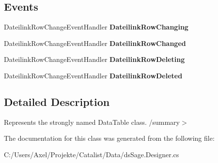 \subsection*{Events}
\begin{DoxyCompactItemize}
\item 
Dateilink\+Row\+Change\+Event\+Handler {\bfseries Dateilink\+Row\+Changing}\hypertarget{class_products_1_1_data_1_1ds_sage_1_1_dateilink_data_table_ac79d3679df2c8093f038d02d1263987d}{}\label{class_products_1_1_data_1_1ds_sage_1_1_dateilink_data_table_ac79d3679df2c8093f038d02d1263987d}

\item 
Dateilink\+Row\+Change\+Event\+Handler {\bfseries Dateilink\+Row\+Changed}\hypertarget{class_products_1_1_data_1_1ds_sage_1_1_dateilink_data_table_a8c92e754719ae1d574ae5f14a26b7558}{}\label{class_products_1_1_data_1_1ds_sage_1_1_dateilink_data_table_a8c92e754719ae1d574ae5f14a26b7558}

\item 
Dateilink\+Row\+Change\+Event\+Handler {\bfseries Dateilink\+Row\+Deleting}\hypertarget{class_products_1_1_data_1_1ds_sage_1_1_dateilink_data_table_a1b259f69756520e54378618b1648116a}{}\label{class_products_1_1_data_1_1ds_sage_1_1_dateilink_data_table_a1b259f69756520e54378618b1648116a}

\item 
Dateilink\+Row\+Change\+Event\+Handler {\bfseries Dateilink\+Row\+Deleted}\hypertarget{class_products_1_1_data_1_1ds_sage_1_1_dateilink_data_table_acbae564a93254bdf61d4d1c5150d21b0}{}\label{class_products_1_1_data_1_1ds_sage_1_1_dateilink_data_table_acbae564a93254bdf61d4d1c5150d21b0}

\end{DoxyCompactItemize}


\subsection{Detailed Description}
Represents the strongly named Data\+Table class. /summary$>$ 

The documentation for this class was generated from the following file\+:\begin{DoxyCompactItemize}
\item 
C\+:/\+Users/\+Axel/\+Projekte/\+Catalist/\+Data/ds\+Sage.\+Designer.\+cs\end{DoxyCompactItemize}
